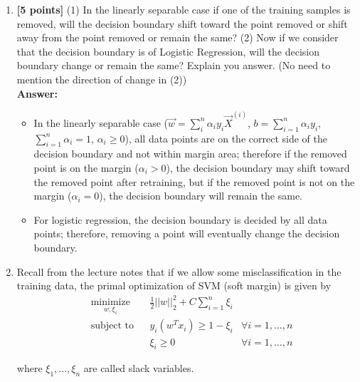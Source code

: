 \documentclass{article}
\begin{document}
\begin{enumerate}

\item\textbf{[5 points]} (1) In the linearly separable case if one of the training samples is removed, will the decision boundary shift toward the point removed or shift away from the point removed or remain the same? (2) Now if we consider that the decision boundary is of Logistic Regression, will the decision boundary change or remain the same? Explain you answer. (No need to mention the direction of change in (2)) \\
\textbf{Answer:}\\
\begin{itemize}
	\item In the linearly separable case ($\vec{w}=\sum_i^n{\alpha_i y_i \vec{X}^{(i)}}$, $b=\sum_{i=1}^n{\alpha_i y_i}$, $\sum_{i=1}^n\alpha_i=1$, $\alpha_i\geq0$), all data points are on the correct side of the decision boundary and not within margin area; therefore if the removed point is on the margin ($\alpha_i>0$), the decision boundary may shift toward the removed point after retraining, but if the removed point is not on the margin ($\alpha_i=0$), the decision boundary will remain the same.
	\item For logistic regression, the decision boundary is decided by all data points; therefore, removing a point will eventually change the decision boundary.
\end{itemize}




\item Recall from the lecture notes that if we allow some misclassification in the training data, the primal optimization of SVM (soft margin) is given by
$$
\begin{aligned}
& \underset{w, \xi_i}{\text{minimize}} && \frac{1}{2}||w||_2^2 + C\sum_{i=1}^n\xi_i\\
& \text{subject to} && y_i(w^Tx_i) \geq 1-\xi_i & \forall i = 1,\ldots, n\\
& && \xi_i \geq 0 & \forall i = 1,\ldots, n
\end{aligned}
$$

where $\xi_1,\ldots, \xi_n$ are called slack variables.
%


\end{enumerate}
\end{document}
